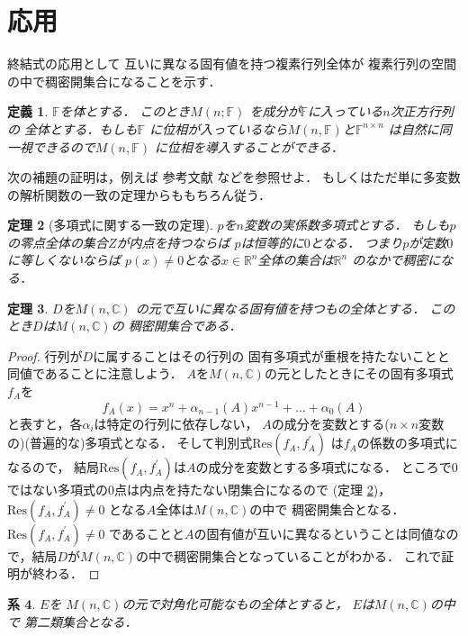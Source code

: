\documentclass[leqno, a4paper, 12pt]{jsarticle}
\newtheorem{thm}{定理}
\newtheorem{cor}[thm]{系}
\newtheorem{df}[thm]{定義}
\newcommand{\rr}{\mathbb{R}}
\newcommand{\cc}{\mathbb{C}}
\newcommand{\myfi}{\mathbb{F}}
\newcommand{\myres}{\mathrm{Res}}
\begin{document}
\section{応用}
終結式の応用として
互いに異なる固有値を持つ複素行列全体が
複素行列の空間の中で稠密開集合になることを示す．


\begin{df}\label{df:mmmm}
$\myfi$を体とする．
このとき$M(n; \myfi)$
を成分が$\myfi$に入っている$n$次正方行列の
全体とする．もしも$\myfi$
に位相が入っているなら$M(n, \myfi)$と$\myfi^{n\times n}$
は自然に同一視できるので$M(n, \myfi)$
に位相を導入することができる．
\end{df}

次の補題の証明は，例えば
参考文献 \cite{D}などを参照せよ．
もしくはただ単に多変数の解析関数の一致の定理からももちろん従う．

\begin{thm}[多項式に関する一致の定理]
\label{thm:poly}
$p$を$n$変数の実係数多項式とする．
もしも$p$の零点全体の集合$Z$が内点を持つならば
$p$は恒等的に$0$となる．
つまり$p$が定数$0$に等しくないならば
$p(x)\neq 0$となる$x\in \rr^{n}$全体の集合は$\rr^{n}$
のなかで稠密になる．
\end{thm}


\begin{thm}\label{thm:dense}
$D$を$M(n, \cc)$
の元で互いに異なる固有値を持つもの全体とする．
このとき$D$は$M(n, \cc)$の
稠密開集合である．
\end{thm}
\begin{proof}
行列が$D$に属することはその行列の
固有多項式が重根を持たないことと同値であることに注意しよう．
$A$を$M(n, \cc)$の元としたときにその固有多項式$f_{A}$を
\[
f_{A}(x)=
x^{n}+\alpha_{n-1}(A)x^{n-1}+\dots + \alpha_{0}(A)
\]
と表すと，各$\alpha_{i}$は特定の行列に依存しない，
$A$の成分を変数とする($n\times n$変数の)(普遍的な)多項式となる．
そして判別式$\myres(f_{A}, f_{A}^{\prime})$
は$f_{A}$の係数の多項式になるので，
結局$\myres(f_{A}, f_{A}^{\prime})$は$A$の成分を変数とする多項式になる．
ところで$0$ではない多項式の0点は内点を持たない閉集合になるので (定理 \ref{thm:poly})，
$\myres(f_{A}, f_{A}^{\prime})\neq 0$
となる$A$全体は$M(n, \cc)$の中で
稠密開集合となる．
$\myres(f_{A}, f_{A}^{\prime})\neq 0$
であることと$A$の固有値が互いに異なるということは同値なので，結局$D$が$M(n, \cc)$の中で稠密開集合となっていることがわかる．
これで証明が終わる．
\end{proof}


\begin{cor}\label{cor:corcor}
$E$を
$M(n, \cc)$の元で対角化可能なもの全体とすると，
$E$は$M(n, \cc)$の中で
第二類集合となる．
\end{cor}
\end{document}
